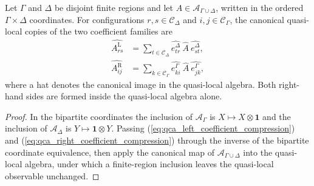 \begin{lemma}
    \label{lem:qca_quasi_local_coefficient_compression}
    \leanok
    Let $\Gamma$ and $\Delta$ be disjoint finite regions and let
    $A\in\mathcal A_{\Gamma\cup\Delta}$, written in the ordered
    $\Gamma\times\Delta$ coordinates.  For configurations
    $r,s\in\mathcal C_\Delta$ and $i,j\in\mathcal C_\Gamma$, the canonical
    quasi-local copies of the two coefficient families are
    \begin{align}
        \widehat{A^{\mathrm L}_{rs}}
         & =\sum_{t\in\mathcal C_\Delta}
        \widehat{e^\Delta_{tr}}\ \widehat A\ \widehat{e^\Delta_{st}},
        \label{eq:qca_quasi_local_left_compression} \\
        \widehat{A^{\mathrm R}_{ij}}
         & =\sum_{k\in\mathcal C_\Gamma}
        \widehat{e^\Gamma_{ki}}\ \widehat A\ \widehat{e^\Gamma_{jk}},
        \label{eq:qca_quasi_local_right_compression}
    \end{align}
    where a hat denotes the canonical image in the quasi-local algebra.  Both
    right-hand sides are formed inside the quasi-local algebra alone.
\end{lemma}

\begin{proof}\leanok
    In the bipartite coordinates the inclusion of $\mathcal A_\Gamma$ is
    $X\mapsto X\otimes\mathbf 1$ and the inclusion of $\mathcal A_\Delta$ is
    $Y\mapsto\mathbf 1\otimes Y$.  Passing
    (\ref{eq:qca_left_coefficient_compression}) and
    (\ref{eq:qca_right_coefficient_compression}) through the inverse of the
    bipartite coordinate equivalence, then apply the canonical map of
    $\mathcal A_{\Gamma\cup\Delta}$ into the quasi-local algebra, under which
    a finite-region inclusion leaves the quasi-local observable unchanged.
\end{proof}

